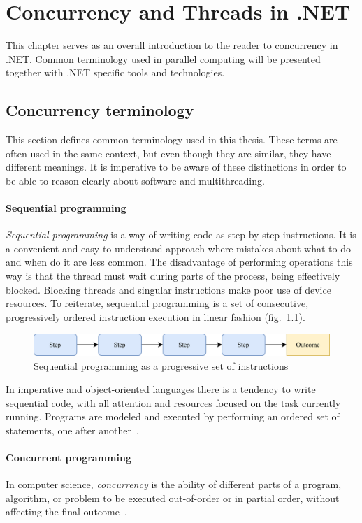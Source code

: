 \chapter{Concurrency and Threads in .NET}
This chapter serves as an overall introduction to the reader to concurrency in .NET. Common terminology used in parallel computing will be presented together with .NET specific tools and technologies. 

\section{Concurrency terminology}
This section defines common terminology used in this thesis. These terms are often used in the same context, but even though they are similar, they have different meanings. It is imperative to be aware of these distinctions in order to be able to reason clearly about software and multithreading.

\subsubsection{Sequential programming}
\emph{Sequential programming} is a way of writing code as step by step instructions. It is a convenient and easy to understand approach where mistakes about what to do and when do it are less common.
The disadvantage of performing operations this way is that the thread must wait during parts of the process, being effectively blocked. Blocking threads and singular instructions make poor use of device resources.
To reiterate, sequential programming is a set of consecutive, progressively ordered instruction execution in linear fashion (fig.~\ref{fig:seq}).

\begin{figure}[htb]
	\centering
		\includegraphics[scale=1.0]{figures02/seq.png}
	\caption{Sequential programming as a progressive set of instructions}
	\label{fig:seq}
\end{figure}

In imperative and object-oriented languages there is a tendency to write sequential code, with all attention and resources focused on the task currently running. Programs are modeled and executed by performing an ordered set of statements, one after another~\cite{terrell_2018}.

\subsubsection{Concurrent programming}
In computer science, \emph{concurrency} is the ability of different parts of a program, algorithm, or problem to be executed out-of-order or in partial order, without affecting the final outcome~\cite{lamport1978time}.

